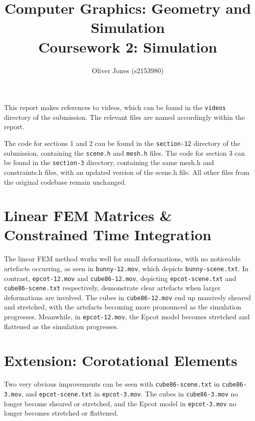 \documentclass[12pt, a4paper]{article}
\title{Computer Graphics: Geometry and Simulation\\Coursework 2: Simulation}
\author{Oliver Jones (s2153980)}
\date{}
\begin{document}
\maketitle

This report makes references to videos, which can be found in the
    \texttt{videos} directory of the submission.
The relevant files are named accordingly within the report.

The code for sections 1 and 2 can be found in the \texttt{section-12} directory
    of the submission, containing the \texttt{scene.h} and \texttt{mesh.h} files.
The code for section 3 can be found in the \texttt{section-3} directory,
    containing the same mesh.h and constraints.h files, with an updated version of
    the scene.h file.
All other files from the original codebase remain unchanged.

\section{Linear FEM Matrices \& Constrained Time Integration}
    \paragraph{}
        The linear FEM method works well for small deformations, with no noticeable
            artefacts occurring, as seen in \texttt{bunny-12.mov}, which depicts
            \texttt{bunny-scene.txt}.
        In contrast, \texttt{epcot-12.mov} and \texttt{cube86-12.mov}, depicting
            \texttt{epcot-scene.txt} and \texttt{cube86-scene.txt} respectively,
            demonstrate clear artefacts when larger deformations are involved.
        The cubes in \texttt{cube86-12.mov} end up massively sheared and stretched,
            with the artefacts becoming more pronounced as the simulation progresses.
        Meanwhile, in \texttt{epcot-12.mov}, the Epcot model becomes stretched and
            flattened as the simulation progresses.

\section{Extension: Corotational Elements}
    \paragraph{}
        Two very obvious improvements can be seen with \texttt{cube86-scene.txt} in
            \texttt{cube86-3.mov}, and \texttt{epcot-scene.txt} in \texttt{epcot-3.mov}.
        The cubes in \texttt{cube86-3.mov} no longer become sheared or stretched, and
            the Epcot model in \texttt{epcot-3.mov} no longer becomes stretched or
            flattened.
\end{document}
